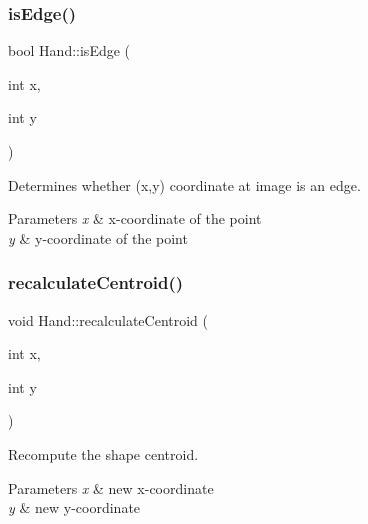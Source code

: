 \subsubsection{\texorpdfstring{is\+Edge()}{isEdge()}}
{\footnotesize\ttfamily bool Hand\+::is\+Edge (\begin{DoxyParamCaption}\item[{int}]{x,  }\item[{int}]{y }\end{DoxyParamCaption})\hspace{0.3cm}{\ttfamily [protected]}}



Determines whether (x,y) coordinate at image is an edge. 


\begin{DoxyParams}{Parameters}
{\em x} & x-\/coordinate of the point \\
\hline
{\em y} & y-\/coordinate of the point \\
\hline
\end{DoxyParams}
\hypertarget{class_hand_a8d3f0317f1b0e2edd9e89d679e616fbc}{}\label{class_hand_a8d3f0317f1b0e2edd9e89d679e616fbc} 
\subsubsection{\texorpdfstring{recalculate\+Centroid()}{recalculateCentroid()}}
{\footnotesize\ttfamily void Hand\+::recalculate\+Centroid (\begin{DoxyParamCaption}\item[{int}]{x,  }\item[{int}]{y }\end{DoxyParamCaption})\hspace{0.3cm}{\ttfamily [protected]}}



Recompute the shape centroid. 


\begin{DoxyParams}{Parameters}
{\em x} & new x-\/coordinate \\
\hline
{\em y} & new y-\/coordinate \\
\hline
\end{DoxyParams}
\hypertarget{class_hand_a3af95101a355738577be20c734a46bf0}{}\label{class_hand_a3af95101a355738577be20c734a46bf0} 
